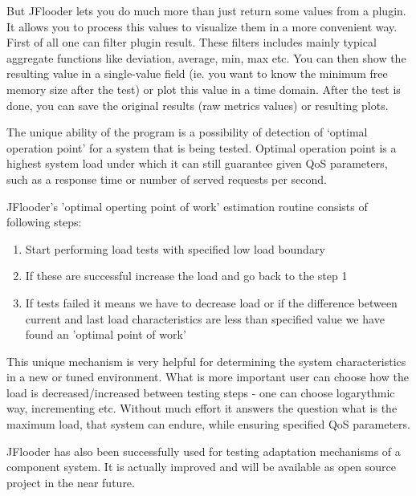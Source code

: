 \documentclass{article}
\begin{document}
But JFlooder lets you do much more than just return some values from a plugin.
It allows you to process this values to visualize them in a more convenient way.
First of all one can filter plugin result.
These filters includes mainly typical aggregate functions like deviation, average, min, max etc.
You can then show the resulting value in a single-value field (ie. you want to know the minimum free memory size after the test) or plot this value in a time domain.
After the test is done, you can save the original results (raw metrics values) or resulting plots. 

The unique ability of the program is a possibility of detection of ‘optimal operation point’ for a system that is being tested. 
Optimal operation point is a highest system load under which it can still guarantee given QoS parameters, such as a response time or number of served requests per second. 

JFlooder's 'optimal operting point of work' estimation routine consists of following steps:
\begin{enumerate}
\item{Start performing load tests with specified low load boundary}
\item{If these are successful increase the load and go back to the step 1}
\item{If tests failed it means we have to decrease load or if the difference between current and last load characteristics are less than specified value we have found an 'optimal point of work'}
\end{enumerate}

This unique mechanism is very helpful for determining the system characteristics in a new or tuned environment. 
What is more important user can choose how the load is decreased/increased between testing steps - one can choose logarythmic way, incrementing etc.
Without much effort it answers the question what is the maximum load, that system can endure, while ensuring specified QoS parameters. 

JFlooder has also been successfully used for testing adaptation mechanisms of a component system. It is actually improved and will be available as open source project in the near future. 
\end{document}
